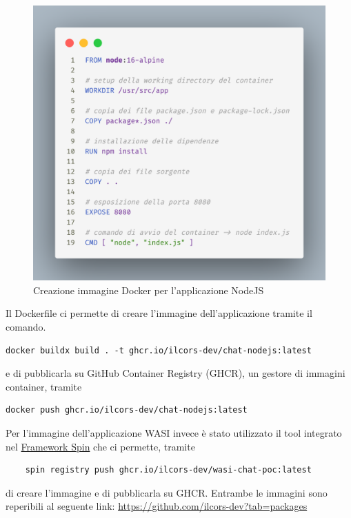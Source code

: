 \begin{figure}[!htb]
    \includegraphics[width=\linewidth]{chapters/3.poc/images/3.nodejs-dockerfile.png}
    \caption{Creazione immagine Docker per l'applicazione NodeJS}\label{fig:nodejs-dockerfile}
\end{figure}
    
Il Dockerfile ci permette di creare l'immagine dell'applicazione tramite il comando.
\begin{verbatim}
docker buildx build . -t ghcr.io/ilcors-dev/chat-nodejs:latest
\end{verbatim}

e di pubblicarla su GitHub Container Registry (GHCR), un gestore di immagini container, tramite

\begin{verbatim}
docker push ghcr.io/ilcors-dev/chat-nodejs:latest
\end{verbatim}

Per l'immagine dell'applicazione WASI invece è stato utilizzato il tool integrato nel
\hyperref[sec:spin-framework]{Framework Spin} che ci permette, tramite

\begin{verbatim}
    spin registry push ghcr.io/ilcors-dev/wasi-chat-poc:latest
\end{verbatim}

di creare l'immagine e di pubblicarla su GHCR. Entrambe le immagini sono reperibili al seguente link:
\url{https://github.com/ilcors-dev?tab=packages}

